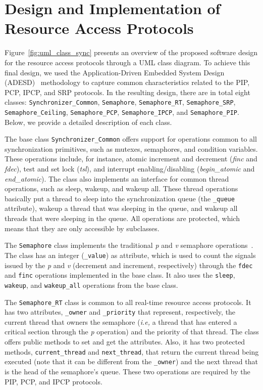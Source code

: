 \section{Design and Implementation of Resource Access Protocols}
\label{sec:des}

Figure~\ref{fig:uml_class_sync} presents an overview of the proposed software 
design for the resource access protocols through a UML class diagram. To 
achieve this final design, we used the Application-Driven Embedded System 
Design (ADESD)~\cite{Froehlich:2001} methodology to capture common 
characteristics related to the PIP, PCP, IPCP, and SRP protocols. In the 
resulting design, there are in total eight classes: 
\texttt{Synchronizer\_Common}, \texttt{Semaphore}, \texttt{Semaphore\_RT}, 
\texttt{Semaphore\_SRP}, \texttt{Semaphore\_Ceiling}, \texttt{Semaphore\_PCP}, 
\texttt{Semaphore\_IPCP}, and \texttt{Semaphore\_PIP}. Below, we provide a 
detailed description of each class.


The base class \texttt{Synchronizer\_Common} offers support for operations 
common to all synchronization primitives, such as mutexes, semaphores, and 
condition variables. These operations include, for instance, atomic increment 
and decrement (\emph{finc} and \emph{fdec}), test and set lock (\emph{tsl}), 
and interrupt enabling/disabling (\emph{begin\_atomic} and \emph{end\_atomic}). 
The class also implements an interface for common thread operations, such as 
sleep, wakeup, and wakeup all. These thread operations basically put a thread 
to sleep into the synchronization queue (the \texttt{\_queue} attribute), 
wakeup a thread that was sleeping in the queue, and wakeup all threads that 
were sleeping in the queue. All operations are protected, which means that they 
are only accessible by subclasses.

The \texttt{Semaphore} class implements the traditional \emph{p} and \emph{v} 
semaphore operations~\cite{Dijkstra:1968}. The class has an integer 
(\texttt{\_value}) as attribute, which is used to count the signals issued by 
the \emph{p} and \emph{v} (decrement and increment, respectively) through the 
\texttt{fdec} and \texttt{finc} operations implemented in the base class. It 
also uses the \texttt{sleep}, \texttt{wakeup}, and \texttt{wakeup\_all} 
operations from the base class.

The \texttt{Semaphore\_RT} class is common to all real-time resource access 
protocols. It has two attributes, \texttt{\_owner} and \texttt{\_priority} that 
represent, respectively, the current thread that owners the semaphore 
(\emph{i.e,} a thread that has entered a critical section through the \emph{p} 
operation) and the priority of that thread. The class offers public methods to 
set and get the attributes. Also, it has two protected methods,
\texttt{current\_thread} and \texttt{next\_thread}, that return the current 
thread being executed (note that it can be different from the \texttt{\_owner}) 
and the next thread that is the head of the semaphore's queue. These two 
operations are required by the PIP, PCP, and IPCP protocols. 

